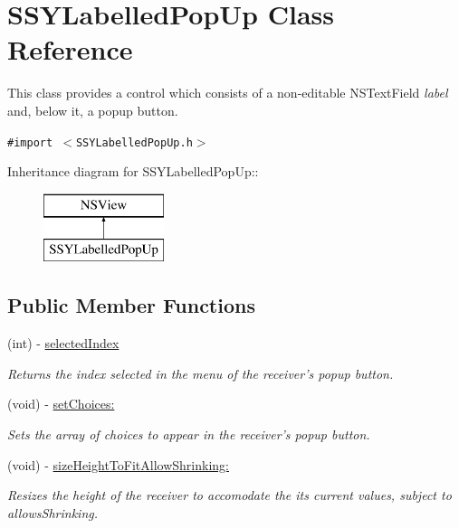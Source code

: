 \hypertarget{interface_s_s_y_labelled_pop_up}{
\section{SSYLabelledPopUp Class Reference}
\label{interface_s_s_y_labelled_pop_up}
}
This class provides a control which consists of a non-editable NSTextField {\em label\/} and, below it, a popup button.  


{\tt \#import $<$SSYLabelledPopUp.h$>$}

Inheritance diagram for SSYLabelledPopUp::\begin{figure}[H]
\begin{center}
\leavevmode
\includegraphics[height=2cm]{interface_s_s_y_labelled_pop_up}
\end{center}
\end{figure}
\subsection*{Public Member Functions}
\begin{CompactItemize}
\item 
\hypertarget{interface_s_s_y_labelled_pop_up_933e38e2dcaf177c8153a40398bdc969}{
(int) - \hyperlink{interface_s_s_y_labelled_pop_up_933e38e2dcaf177c8153a40398bdc969}{selectedIndex}}
\label{interface_s_s_y_labelled_pop_up_933e38e2dcaf177c8153a40398bdc969}

\begin{CompactList}\small\item\em Returns the index selected in the menu of the receiver's popup button. \item\end{CompactList}\item 
(void) - \hyperlink{interface_s_s_y_labelled_pop_up_284d5bef6c5b4e71542cbe3d2002700f}{setChoices:}
\begin{CompactList}\small\item\em Sets the array of choices to appear in the receiver's popup button. \item\end{CompactList}\item 
(void) - \hyperlink{interface_s_s_y_labelled_pop_up_04f741810a59176da8704390e4d95a57}{sizeHeightToFitAllowShrinking:}
\begin{CompactList}\small\item\em Resizes the height of the receiver to accomodate the its current values, subject to allowsShrinking. \item\end{CompactList}\end{CompactItemize}
